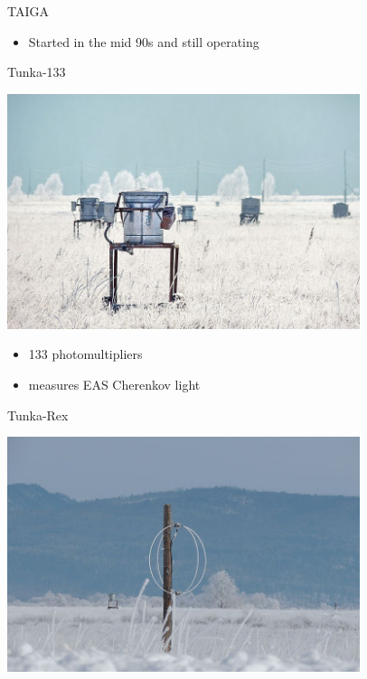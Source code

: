 \begin{frame}{TAIGA}
\footnotesize
\vspace{-1em}
\begin{itemize}
 \item Started in the mid 90s and still operating
\end{itemize}
\vspace{-2em}
\begin{minipage}[t]{0.31\textwidth}
  \begin{block}{\small Tunka-133}
    \parbox[c][0.20\textheight][t]{1\textwidth}{
      \centering
      \includegraphics[width=0.7742\textwidth]{pics/Tunka-133.jpg}
    }
    \hfill
    \parbox[c][0.15\textheight][t]{1\textwidth}{
      \begin{itemize}
        \setlength{\itemsep}{0pt}
        \item 133 photomultipliers
        \item measures EAS Cherenkov light
      \end{itemize}
    }
  \end{block}
\end{minipage}
\hfill
\begin{minipage}[t]{0.31\textwidth}
  \begin{block}{\small Tunka-Rex}
    \parbox[c][0.20\textheight][t]{1\textwidth}{
      \centering
      \includegraphics[width=0.7742\textwidth]{pics/Tunka-Rex.jpg}
}
\end{block}
\end{minipage}
\end{frame}

